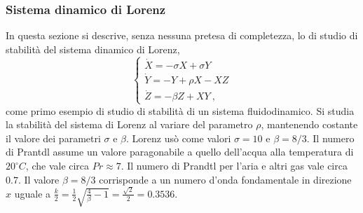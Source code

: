 \subsubsection{Sistema dinamico di Lorenz}
In questa sezione si descrive, senza nessuna pretesa di completezza,
 lo di studio di stabilità del sistema dinamico di Lorenz,
\begin{equation}
    \begin{cases}
      \dot{X} = - \sigma X + \sigma Y \\
      \dot{Y} = - Y + \rho X - X Z \\
      \dot{Z} = - \beta Z + X Y \ ,
    \end{cases}
\end{equation}
 come primo esempio di studio di stabilità di un sistema fluidodinamico.
Si studia la stabilità del sistema di Lorenz al variare del parametro $\rho$,
 mantenendo costante il valore dei parametri $\sigma$ e $\beta$.
Lorenz usò come valori $\sigma = 10$ e $\beta = 8/3$.
 Il numero di Prantdl assume un valore paragonabile a quello dell'acqua alla temperatura
 di $20^\circ C$, che vale circa $Pr \approx 7$. Il numero di Prandtl per l'aria e altri gas
 vale circa $0.7$. Il valore $\beta = 8/3$ corrisponde a
 un numero d'onda fondamentale in direzione $x$ uguale a
 $\frac{k}{2} = \frac{1}{2} \sqrt{\frac{4}{\beta} - 1} = \frac{\sqrt{2}}{2} =
 0.3536$.

